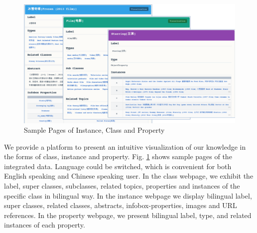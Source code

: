 \documentclass[runningheads,a4paper]{llncs}
\begin{document}
\begin{figure}[ht]
    \centerline{\includegraphics[width=1\columnwidth]{fig/xlore}}
    \caption{Sample Pages of Instance, Class and Property}
    \label{fig:xlore}
\end{figure}

We provide a platform to present an intuitive visualization of our knowledge in the forms of class, instance and property. Fig. \ref{fig:xlore} shows sample pages of the integrated data. Language could be switched, which is convenient for both English speaking and Chinese speaking user. In the class webpage, we exhibit the label, super classes, subclasses, related topics, properties and instances of the specific class in bilingual way. In the instance webpage we display bilingual label, super classes, related classes, abstracts, infobox-properties, images and URL references. In the property webpage, we present bilingual label, type, and related instances of each property.
\end{document}
